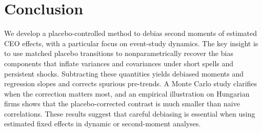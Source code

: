 \documentclass[11pt,a4paper]{article}
\begin{document}
\section{Conclusion}

We develop a placebo-controlled method to debias second moments of estimated CEO effects, with a particular focus on event-study dynamics. The key insight is to use matched placebo transitions to nonparametrically recover the bias components that inflate variances and covariances under short spells and persistent shocks. Subtracting these quantities yields debiased moments and regression slopes and corrects spurious pre-trends. A Monte Carlo study clarifies when the correction matters most, and an empirical illustration on Hungarian firms shows that the placebo-corrected contrast is much smaller than naive correlations. These results suggest that careful debiasing is essential when using estimated fixed effects in dynamic or second-moment analyses.



\end{document}
